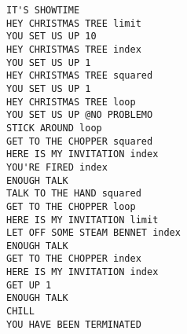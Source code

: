 \headerfooteroff{}%
\vspace*{\fill}%
\pagecolor{black!5}\afterpage{\nopagecolor}%
%
\iffalse
\lstset{ %
  basicstyle=\footnotesize\tt,        %
  breaklines=true,                 %
  captionpos=b,                    %
  commentstyle=\color{black!30},    %
  escapeinside={\%*}{*)},          %
  extendedchars=true,              %
  keepspaces=true,                 %
  keywordstyle=\color{black!60},       %
  morekeywords={*,...},           %
  numbers=left,
  xleftmargin=1.5em,
  framexleftmargin=1em,
  numbersep=5pt,                   %
  numberstyle=\footnotesize\color{black!60}, %
  rulecolor=\color{black},         %
  showspaces=false,                %
  showstringspaces=false,          %
  showtabs=false,                  %
  stepnumber=1,                    %
  stringstyle=\color{black},     %
  tabsize=2	                   %
}
\fi%
\begin{lstlisting}[language=ArnoldC]
IT'S SHOWTIME
HEY CHRISTMAS TREE limit
YOU SET US UP 10
HEY CHRISTMAS TREE index
YOU SET US UP 1
HEY CHRISTMAS TREE squared
YOU SET US UP 1
HEY CHRISTMAS TREE loop
YOU SET US UP @NO PROBLEMO
STICK AROUND loop
GET TO THE CHOPPER squared
HERE IS MY INVITATION index
YOU'RE FIRED index
ENOUGH TALK
TALK TO THE HAND squared
GET TO THE CHOPPER loop
HERE IS MY INVITATION limit
LET OFF SOME STEAM BENNET index
ENOUGH TALK
GET TO THE CHOPPER index
HERE IS MY INVITATION index
GET UP 1
ENOUGH TALK
CHILL
YOU HAVE BEEN TERMINATED
\end{lstlisting}
\vspace*{\fill}
\clearpage
\headerfooteron{}
